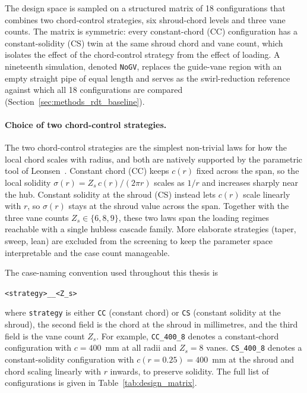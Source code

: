 The design space is sampled on a structured matrix of 18 configurations that combines two chord-control strategies, six shroud-chord levels and three vane counts. The matrix is symmetric: every constant-chord (CC) configuration has a constant-solidity (CS) twin at the same shroud chord and vane count, which isolates the effect of the chord-control strategy from the effect of loading. A nineteenth simulation, denoted \texttt{NoGV}, replaces the guide-vane region with an empty straight pipe of equal length and serves as the swirl-reduction reference against which all 18 configurations are compared (Section~\ref{sec:methods_rdt_baseline}).
 
\paragraph{Choice of two chord-control strategies.}
The two chord-control strategies are the simplest non-trivial laws for how the local chord scales with radius, and both are natively supported by the parametric tool of Leonsen~\cite{Leonsen2025}. Constant chord (CC) keeps $c(r)$ fixed across the span, so the local solidity $\sigma(r) = Z_s\, c(r) / (2\pi r)$ scales as $1/r$ and increases sharply near the hub. Constant solidity at the shroud (CS) instead lets $c(r)$ scale linearly with $r$, so $\sigma(r)$ stays at the shroud value across the span. Together with the three vane counts $Z_s \in \{6, 8, 9\}$, these two laws span the loading regimes reachable with a single hubless cascade family. More elaborate strategies (taper, sweep, lean) are excluded from the screening to keep the parameter space interpretable and the case count manageable.
 
The case-naming convention used throughout this thesis is
 
\medskip
\centerline{\texttt{<strategy>\_<chord shroud in mm>\_<Z\_s>}}
\medskip
 
\noindent
where \texttt{strategy} is either \texttt{CC} (constant chord) or \texttt{CS} (constant solidity at the shroud), the second field is the chord at the shroud in millimetres, and the third field is the vane count $Z_s$. For example, \texttt{CC\_400\_8} denotes a constant-chord configuration with $c = 400$~mm at all radii and $Z_s = 8$ vanes. \texttt{CS\_400\_8} denotes a constant-solidity configuration with $c(r=0.25) = 400$~mm at the shroud and chord scaling linearly with $r$ inwards, to preserve solidity. The full list of configurations is given in Table~\ref{tab:design_matrix}.
 
